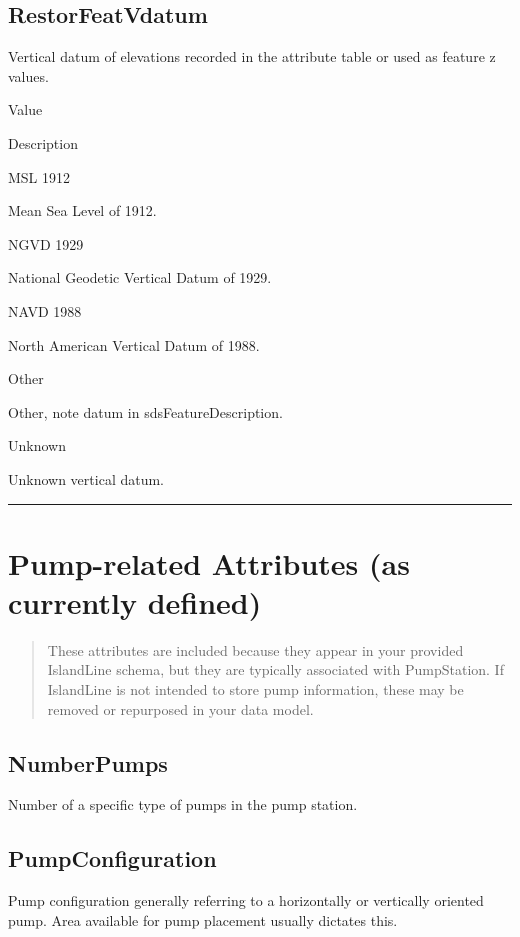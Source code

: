 \documentclass[
  letterpaper,
  DIV=11,
  numbers=noendperiod]{scrreprt}
\begin{document}
\subsection{RestorFeatVdatum}\label{restorfeatvdatum-6}

Vertical datum of elevations recorded in the attribute table or used as
feature z values.

Value

Description

MSL 1912

Mean Sea Level of 1912.

NGVD 1929

National Geodetic Vertical Datum of 1929.

NAVD 1988

North American Vertical Datum of 1988.

Other

Other, note datum in sdsFeatureDescription.

Unknown

Unknown vertical datum.

\begin{center}\rule{0.5\linewidth}{0.5pt}\end{center}

\section{Pump-related Attributes (as currently
defined)}\label{pump-related-attributes-as-currently-defined}

\begin{quote}
These attributes are included because they appear in your provided
IslandLine schema, but they are typically associated with PumpStation.
If IslandLine is not intended to store pump information, these may be
removed or repurposed in your data model.
\end{quote}

\subsection{NumberPumps}\label{numberpumps}

Number of a specific type of pumps in the pump station.

\subsection{PumpConfiguration}\label{pumpconfiguration}

Pump configuration generally referring to a horizontally or vertically
oriented pump. Area available for pump placement usually dictates this.
\end{document}

